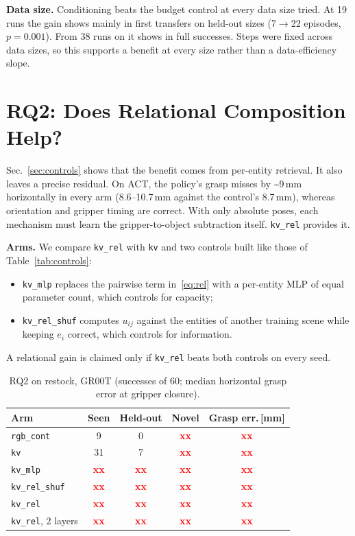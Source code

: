\documentclass[letterpaper, 10pt, journal, twoside]{IEEEtran}
\newcommand{\tbd}[1][]{\textcolor{red}{\textbf{xx}#1}}
\newcommand{\arm}[1]{\texttt{#1}}
\begin{document}
\textbf{Data size.} Conditioning beats the budget control at every data size
tried. At 19 runs the gain shows mainly in first transfers on held-out sizes
(7$\rightarrow$22 episodes, $p=0.001$). From 38 runs on it shows in full
successes. Steps were fixed across data sizes, so this supports a benefit at
every size rather than a data-efficiency slope.

\section{RQ2: Does Relational Composition Help?}
\label{sec:rq2}

Sec.~\ref{sec:controls} shows that the benefit comes from per-entity
retrieval. It also leaves a precise residual. On ACT, the policy's grasp
misses by \textasciitilde9\,mm horizontally in every arm (8.6--10.7\,mm
against the control's 8.7\,mm), whereas orientation and gripper timing are
correct. With only absolute poses, each mechanism must learn the
gripper-to-object subtraction itself. \arm{kv\_rel} provides it.

\textbf{Arms.} We compare \arm{kv\_rel} with \arm{kv} and two controls built
like those of Table~\ref{tab:controls}:
\begin{itemize}
  \item \arm{kv\_mlp} replaces the pairwise term in~\eqref{eq:rel} with a
    per-entity MLP of equal parameter count, which controls for capacity;
  \item \arm{kv\_rel\_shuf} computes $u_{ij}$ against the entities of
    another training scene while keeping $e_i$ correct, which controls for
    information.
\end{itemize}
A relational gain is claimed only if \arm{kv\_rel} beats both controls on
every seed.

\begin{table}[t]
\centering
\caption{RQ2 on restock, GR00T (successes of 60; median horizontal grasp
error at gripper closure).}
\label{tab:rq2}
\footnotesize
\setlength{\tabcolsep}{4pt}
\begin{tabular}{@{}lcccc@{}}
\toprule
Arm & Seen & Held-out & Novel & Grasp err.\,[mm] \\
\midrule
\arm{rgb\_cont}      & 9    & 0    & \tbd & \tbd \\
\arm{kv}             & 31   & 7    & \tbd & \tbd \\
\arm{kv\_mlp}        & \tbd & \tbd & \tbd & \tbd \\
\arm{kv\_rel\_shuf}  & \tbd & \tbd & \tbd & \tbd \\
\arm{kv\_rel}        & \tbd & \tbd & \tbd & \tbd \\
\arm{kv\_rel}, 2 layers & \tbd & \tbd & \tbd & \tbd \\
\bottomrule
\end{tabular}
\end{table}
\end{document}
